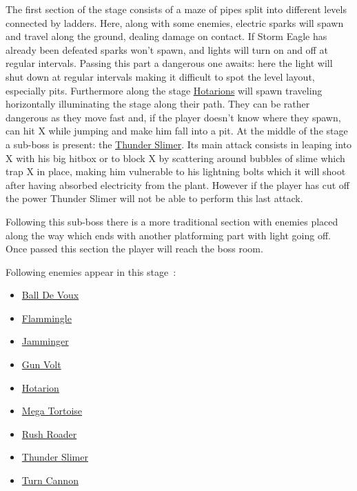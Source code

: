 The first section of the stage consists of a maze of pipes split into different levels connected by ladders. Here, along with some enemies, electric sparks will spawn and travel along the ground, dealing damage on contact. If Storm Eagle has already been defeated sparks won't spawn, and lights will turn on and off at regular intervals. Passing this part a dangerous one awaits: here the light will shut down at regular intervals making it difficult to spot the level layout, especially pits. Furthermore along the stage  \hyperlink{enem:Hotarion}{Hotarions} will spawn traveling horizontally illuminating the stage along their path. They can be rather dangerous as they move fast and, if the player doesn't know where they spawn, can hit X while jumping and make him fall into a pit.
At the middle of the stage a sub-boss is present: the \hyperlink{miniboss:Thunder_Slimer}{Thunder Slimer}. Its main attack consists in leaping into X with his big hitbox or to block X by scattering around bubbles of slime which trap X in place, making him vulnerable to his lightning bolts which it will shoot after having absorbed electricity from the plant. However if the player has cut off the power Thunder Slimer will not be able to perform this last attack.

Following this sub-boss there is a more traditional section with enemies placed along the way which ends with another platforming part with light going off. Once passed this section the player will reach the boss room.

Following enemies appear in this stage~\cite{wiki:Power_plant}:
\begin{itemize}
	\item \hyperlink{enem:Ball_De_Voux}{Ball De Voux}
	\item \hyperlink{enem:Flammingle}{Flammingle}
	\item \hyperlink{enem:Jamminger}{Jamminger}
	\item \hyperlink{enem:Gun_Volt}{Gun Volt}
	\item \hyperlink{enem:Hotarion}{Hotarion}
	\item \hyperlink{enem:Mega_Tortoise}{Mega Tortoise}
	\item \hyperlink{enem:Rush_Roader}{Rush Roader}
	\item \hyperlink{miniboss:Thunder_Slimer}{Thunder Slimer}
	\item \hyperlink{enem:Turn_Cannon}{Turn Cannon}
\end{itemize}

